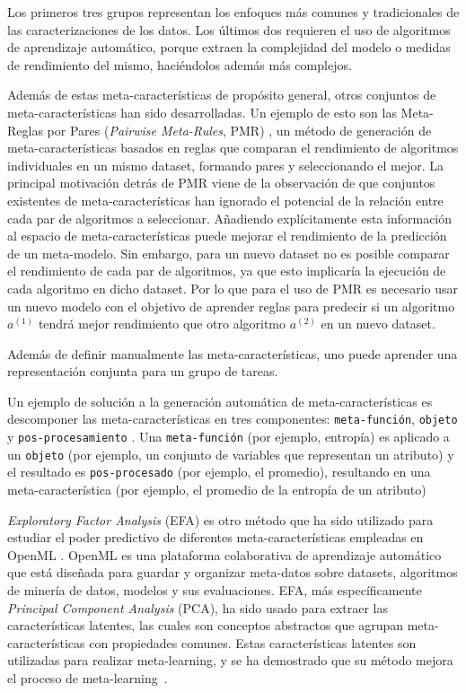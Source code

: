 Los primeros tres grupos representan los enfoques más comunes y tradicionales de las caracterizaciones de los datos. Los últimos dos requieren el uso de algoritmos de aprendizaje automático, porque extraen la complejidad del modelo o medidas de rendimiento del mismo, haciéndolos además más complejos.

Además de estas meta-características de propósito general, otros conjuntos de meta-características han sido desarrolladas. Un ejemplo de esto son las Meta-Reglas por Pares (\textit{Pairwise Meta-Rules}, PMR) \cite{sun2013pairwise}, un método de generación de meta-características basados en reglas que comparan el rendimiento de algoritmos individuales en un mismo dataset, formando pares y seleccionando el mejor. La principal motivación detrás de PMR viene de la observación de que conjuntos existentes de meta-características han ignorado el potencial de la relación entre cada par de algoritmos a seleccionar. Añadiendo explícitamente esta información al espacio de meta-características puede mejorar el rendimiento de la predicción de un meta-modelo. Sin embargo, para un nuevo dataset no es posible comparar el rendimiento de cada par de algoritmos, ya que esto implicaría la ejecución de cada algoritmo en dicho dataset. Por lo que para el uso de PMR es necesario usar un nuevo modelo con el objetivo de aprender reglas para predecir si un algoritmo $a^{(1)}$ tendrá mejor rendimiento que otro algoritmo $a^{(2)}$ en un nuevo dataset.

Además de definir manualmente las meta-características, uno puede aprender una representación conjunta para un grupo de tareas. 

Un ejemplo de solución a la generación automática de meta-características es descomponer las meta-características en tres componentes: \texttt{meta-función}, \texttt{objeto} y  \texttt{pos-procesamiento} \cite{Pinto2016TowardsAG, pinto2014framework}. Una \texttt{meta-función} (por ejemplo, entropía) es aplicado a un \texttt{objeto} (por ejemplo, un conjunto de variables que representan un atributo) y el resultado es \texttt{pos-procesado} (por ejemplo, el promedio), resultando en una meta-característica (por ejemplo, el promedio de la entropía de un atributo) %

\textit{Exploratory Factor Analysis} (EFA) es otro método que ha sido utilizado para estudiar el poder predictivo de diferentes meta-características empleadas en OpenML \cite{bilalli2017predictive}. OpenML es una plataforma colaborativa de aprendizaje automático que está diseñada para guardar y organizar meta-datos sobre datasets, algoritmos de minería de datos, modelos y sus evaluaciones. EFA, más específicamente \textit{Principal Component Analysis} (PCA), ha sido usado para extraer las características latentes, las cuales son conceptos abstractos que agrupan meta-características con propiedades comunes. Estas características latentes son utilizadas para realizar meta-learning, y se ha demostrado que su método mejora el proceso de meta-learning~\cite{bilalli2017predictive}.

